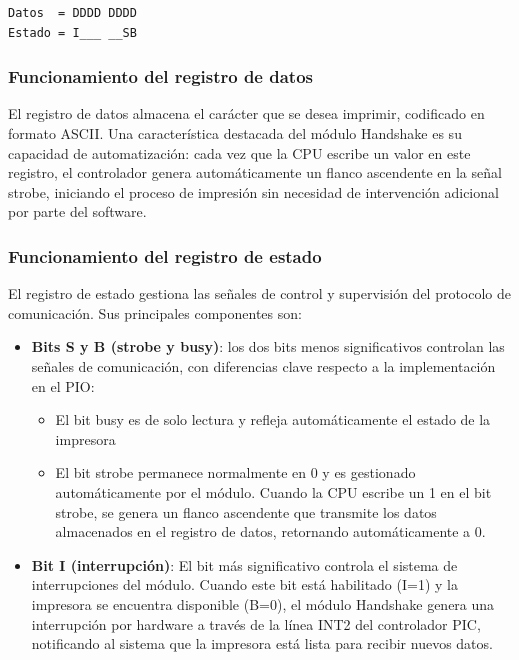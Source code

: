 \documentclass[12pt,oneside]{templates/unerthesis}
\providecommand{\tightlist}{%
  \setlength{\itemsep}{0pt}\setlength{\parskip}{0pt}}
\begin{document}
\begin{verbatim}
Datos  = DDDD DDDD
Estado = I___ __SB
\end{verbatim}

\hypertarget{funcionamiento-del-registro-de-datos}{%
\subsubsection{Funcionamiento del registro de datos}\label{funcionamiento-del-registro-de-datos}}

El registro de datos almacena el carácter que se desea imprimir, codificado en formato ASCII. Una característica destacada del módulo Handshake es su capacidad de automatización: cada vez que la CPU escribe un valor en este registro, el controlador genera automáticamente un flanco ascendente en la señal strobe, iniciando el proceso de impresión sin necesidad de intervención adicional por parte del software.

\hypertarget{funcionamiento-del-registro-de-estado}{%
\subsubsection{Funcionamiento del registro de estado}\label{funcionamiento-del-registro-de-estado}}

El registro de estado gestiona las señales de control y supervisión del protocolo de comunicación. Sus principales componentes son:

\begin{itemize}
\tightlist
\item
  \textbf{Bits S y B (strobe y busy)}: los dos bits menos significativos controlan las señales de comunicación, con diferencias clave respecto a la implementación en el PIO:

  \begin{itemize}
  \tightlist
  \item
    El bit busy es de solo lectura y refleja automáticamente el estado de la impresora
  \item
    El bit strobe permanece normalmente en 0 y es gestionado automáticamente por el módulo. Cuando la CPU escribe un 1 en el bit strobe, se genera un flanco ascendente que transmite los datos almacenados en el registro de datos, retornando automáticamente a 0.
  \end{itemize}
\item
  \textbf{Bit I (interrupción)}: El bit más significativo controla el sistema de interrupciones del módulo. Cuando este bit está habilitado (I=1) y la impresora se encuentra disponible (B=0), el módulo Handshake genera una interrupción por hardware a través de la línea INT2 del controlador PIC, notificando al sistema que la impresora está lista para recibir nuevos datos.
\end{itemize}
\end{document}
